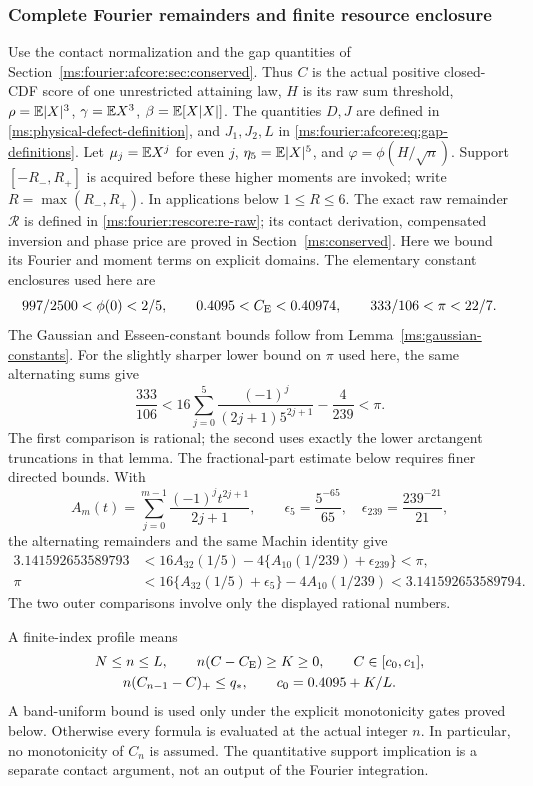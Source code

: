 \subsubsection{Complete Fourier remainders and finite resource enclosure}
\label{ms:fourier:rescore:sec:setup}
Use the contact normalization and the gap quantities of
Section~\ref{ms:fourier:afcore:sec:conserved}. Thus $C$ is the actual positive
closed-CDF score of one unrestricted attaining law, $H$ is its raw
sum threshold, $\rho=\mathbb E|X|^3$, $\gamma=\mathbb E X^3$,
$\beta=\mathbb E[X|X|]$. The quantities $D,J$ are defined in
\eqref{ms:physical-defect-definition}, and $J_1,J_2,L$ in
\eqref{ms:fourier:afcore:eq:gap-definitions}. Let
$\mu_j=\mathbb E X^j$ for even $j$, $\eta_5=\mathbb E|X|^5$, and
$\varphi=\phi(H/\sqrt n)$. Support $[-R_-,R_+]$ is acquired before
these higher moments are invoked; write $R=\max(R_-,R_+)$.
In applications below $1\le R\le6$.
The exact raw remainder $\mathcal R$ is defined in
\eqref{ms:fourier:rescore:re-raw}; its contact derivation, compensated
inversion and phase price are proved in Section~\ref{ms:conserved}.
Here we bound its Fourier and moment terms on explicit domains.
The elementary constant enclosures used here are
\[
 997/2500<\phi(0)<2/5,\qquad
 0.4095<C_{\mathrm E}<0.40974,\qquad 333/106<\pi<22/7.
\]
The Gaussian and Esseen-constant bounds follow from
Lemma~\ref{ms:gaussian-constants}. For the slightly sharper lower bound
on $\pi$ used here, the same alternating sums give
\[
 \frac{333}{106}
 <16\sum_{j=0}^{5}\frac{(-1)^j}{(2j+1)5^{2j+1}}-\frac4{239}
 <\pi.
\]
The first comparison is rational; the second uses exactly the lower
arctangent truncations in that lemma.
The fractional-part estimate below requires finer directed bounds.
With
\[
 A_m(t)=\sum_{j=0}^{m-1}\frac{(-1)^jt^{2j+1}}{2j+1},\qquad
 \epsilon_5=\frac{5^{-65}}{65},\quad
 \epsilon_{239}=\frac{239^{-21}}{21},
\]
the alternating remainders and the same Machin identity give
\begin{align*}
 3.141592653589793
 &<16A_{32}(1/5)-4\{A_{10}(1/239)+\epsilon_{239}\}<\pi,\\
 \pi&<16\{A_{32}(1/5)+\epsilon_5\}-4A_{10}(1/239)
 <3.141592653589794.
\end{align*}
The two outer comparisons involve only the displayed rational numbers.

A finite-index profile means
\begin{equation}\label{ms:fourier:rescore:u-profile}
\begin{gathered}
 N\le n\le L,\qquad n(C-C_{\mathrm E})\ge K\ge0,\qquad C\in[c_0,c_1],\\
 n(C_{n-1}-C)_+\le q_*,\qquad c_0=0.4095+K/L.
\end{gathered}
\end{equation}
A band-uniform bound is used only under the explicit monotonicity
gates proved below. Otherwise every formula is evaluated at the
actual integer $n$. In particular, no monotonicity of $C_n$ is assumed.
The quantitative support implication is a separate contact argument,
not an output of the Fourier integration.

